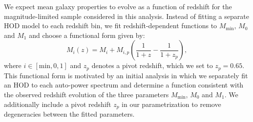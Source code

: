 \documentclass[a4paper,11pt]{article}
\begin{document}
    We expect mean galaxy properties to evolve as a function of redshift for the magnitude-limited sample considered in this analysis. Instead of fitting a separate HOD model to each redshift bin, we fit redshift-dependent functions to $M_{\mathrm{min}}$, $M_{0}$ and $M_{1}$ and choose a functional form given by:
    \begin{equation}
      M_{i}(z) = M_{i} + M_{i, p} \left(\frac{1}{1+z} - \frac{1}{1+z_{p}}\right),
    \end{equation}
    where $i \in [\mathrm{min}, 0, 1]$ and $z_{p}$ denotes a pivot redshift, which we set to $z_{p} = 0.65$. This functional form is motivated by an initial analysis in which we separately fit an HOD to each auto-power spectrum and determine a function consistent with the observed redshift evolution of the three parameters $M_{\mathrm{min}}$, $M_{0}$ and $M_{1}$. We additionally include a pivot redshift $z_{p}$ in our parametrization to remove degeneracies between the fitted parameters. 
\end{document}
